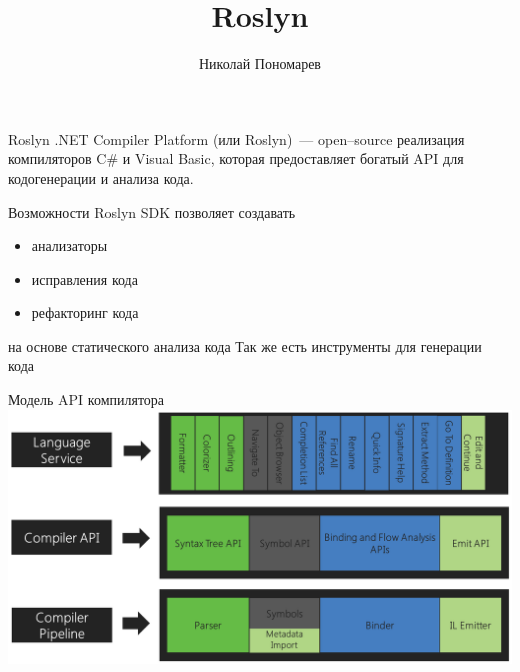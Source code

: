 \documentclass[aspectratio=169]{beamer}
\title{Roslyn}
\author{Николай Пономарев}
\date{}
\begin{document}
\maketitle

\begin{frame}{Roslyn}
        .NET Compiler Platform (или Roslyn)~--- open--source реализация компиляторов C\# и Visual Basic, которая предоставляет богатый API для кодогенерации и анализа кода.
\end{frame}

\begin{frame}{Возможности}
    Roslyn SDK позволяет создавать
    \begin{itemize}
        \item анализаторы
        \item исправления кода
        \item рефакторинг кода
    \end{itemize}
    на основе статического анализа кода
    Так же есть инструменты для генерации кода
\end{frame}

\begin{frame}{Модель API компилятора}
    \includegraphics[width=\textwidth]{compiler-pipeline-lang-svc.png}
\end{frame}
\end{document}
